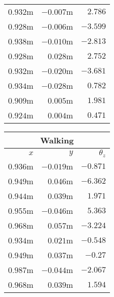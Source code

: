 \begin{appendices}
\begin{table}[!h]
\begin{tabular}{ r r r }
		$0.932$m &
		$-0.007$m &
		$2.786$\textdegree{} \\

		$0.928$m &
		$-0.006$m &
		$-3.599$\textdegree{} \\

		$0.938$m &
		$-0.010$m &
		$-2.813$\textdegree{} \\

		$0.928$m &
		$0.028$m &
		$2.752$\textdegree{} \\

		$0.932$m &
		$-0.020$m &
		$-3.681$\textdegree{} \\

		$0.934$m &
		$-0.028$m &
		$0.782$\textdegree{} \\

		$0.909$m &
		$0.005$m &
		$1.981$\textdegree{} \\

		\midrule
		$0.924$m &
		$0.004$m &
		$0.471$\textdegree{} \\
		\bottomrule
	\end{tabular}
	\hspace{2ex}
	\begin{tabular}{ r r r }
		\toprule
		\multicolumn{3}{c}{\textbf{Walking}} \\
		\midrule
		\textbf{$x$} & \textbf{$y$} & \textbf{$\theta_z$} \\
		\midrule
		$0.936$m &
		$-0.019$m &
		$-0.871$\textdegree{} \\

		$0.949$m &
		$0.046$m &
		$-6.362$\textdegree{} \\

		$0.944$m &
		$0.039$m &
		$1.971$\textdegree{} \\

		$0.955$m &
		$-0.046$m &
		$5.363$\textdegree{} \\

		$0.968$m &
		$0.057$m &
		$-3.224$\textdegree{} \\

		$0.934$m &
		$0.021$m &
		$-0.548$\textdegree{} \\

		$0.949$m &
		$0.037$m &
		$-0.27$\textdegree{} \\

		$0.987$m &
		$-0.044$m &
		$-2.067$\textdegree{} \\

		$0.968$m &
		$0.039$m &
		$1.594$\textdegree{} \\


\end{tabular}
\end{table}
\end{appendices}
